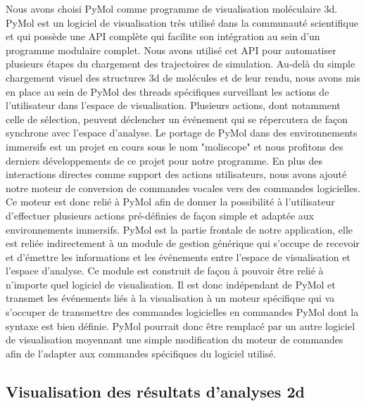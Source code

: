Nous avons choisi PyMol \cite{delano_pymol_2002} comme programme de visualisation moléculaire 3d. PyMol est un logiciel de visualisation très utilisé dans la communauté scientifique et qui possède une API complète qui facilite son intégration au sein d'un programme modulaire complet. Nous avons utilisé cet API pour automatiser plusieurs étapes du chargement des trajectoires de simulation. Au-delà du simple chargement visuel des structures 3d de molécules et de leur rendu, nous avons mis en place au sein de PyMol des threads spécifiques surveillant les actions de l'utilisateur dans l'espace de visualisation. Plusieurs actions, dont notamment celle de sélection, peuvent déclencher un événement qui se répercutera de façon synchrone avec l'espace d'analyse. Le portage de PyMol dans des environnements immersifs est un projet en cours sous le nom "moliscope" et nous profitons des derniers développements de ce projet pour notre programme.
En plus des interactions directes comme support des actions utilisateurs, nous avons ajouté notre moteur de conversion de commandes vocales vers des commandes logicielles. Ce moteur est donc relié à PyMol afin de donner la possibilité à l'utilisateur d'effectuer plusieurs actions pré-définies de façon simple et adaptée aux environnements immersifs.
PyMol est la partie frontale de notre application, elle est reliée indirectement à un module de gestion générique qui s'occupe de recevoir et d'émettre les informations et les événements entre l'espace de visualisation et l'espace d'analyse. Ce module est construit de façon à pouvoir être relié à n'importe quel logiciel de visualisation. Il est donc indépendant de PyMol et transmet les événements liés à la visualisation à un moteur spécifique qui va s'occuper de transmettre des commandes logicielles en commandes PyMol dont la syntaxe est bien définie. PyMol pourrait donc être remplacé par un autre logiciel de visualisation moyennant une simple modification du moteur de commandes afin de l'adapter aux commandes spécifiques du logiciel utilisé.

\subsection{Visualisation des résultats d'analyses 2d}

